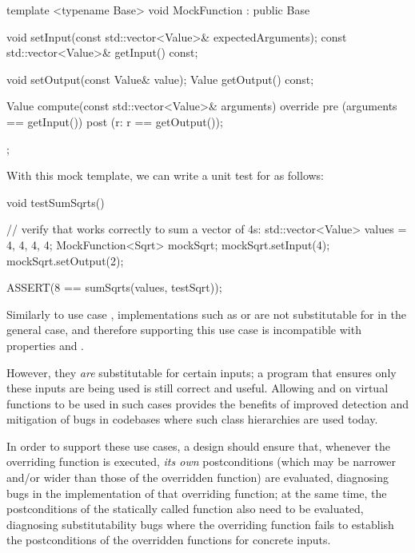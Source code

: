 \begin{codeblock}
template <typename Base>
void MockFunction : public Base {
  void setInput(const std::vector<Value>& expectedArguments);
  const std::vector<Value>& getInput() const;
  
  void setOutput(const Value& value);
  Value getOutput() const;
  
  Value compute(const std::vector<Value>& arguments) override
    pre (arguments == getInput())
    post (r: r == getOutput());
};
\end{codeblock}

With this mock template, we can write a unit test for  as follows:

\begin{codeblock}
void testSumSqrts() {
  // verify that  works correctly to sum a vector of 4s:
  std::vector<Value> values = {4, 4, 4, 4};
  MockFunction<Sqrt> mockSqrt;
  mockSqrt.setInput({4});
  mockSqrt.setOutput({2});
  
  ASSERT(8 == sumSqrts(values, testSqrt));
}
\end{codeblock}

Similarly to use case , implementations such as  or  are not substitutable for  in the general case, and therefore supporting this use case is incompatible with properties  and .

However, they \emph{are} substitutable for certain inputs; a program that ensures only these inputs are being used is still correct and useful. Allowing  and  on virtual functions to be used in such cases provides the benefits of improved detection and mitigation of bugs in codebases where such class hierarchies are used today.

In order to support these use cases, a design should ensure that, whenever the overriding function is executed, \emph{its own} postconditions (which may be narrower and/or wider than those of the overridden function) are evaluated, diagnosing bugs in the implementation of that overriding function; at the same time, the postconditions of the statically called function also need to be evaluated, diagnosing substitutability bugs where the overriding function fails to establish the postconditions of the overridden functions for concrete inputs.


